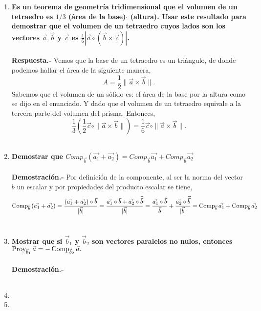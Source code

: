 \begin{enumerate}
\item \textbf{\boldmath Es un teorema de geometría tridimensional que el volumen de un tetraedro es $1/3$ (área de la base)$\cdot$ (altura). Usar este resultado para demostrar que el volumen de un tetraedro cuyos lados son los vectores $\vec{a},\vec{b}$ y $\vec{c}$ es $\frac{1}{6}\left|\vec{a}\circ \left(\vec{b}\times \vec{c}\right)\right|$.\\\\
    Respuesta.-}\; Vemos que la base de un tetraedro es un triángulo, de donde podemos hallar el área de la siguiente manera,
    $$A=\dfrac{1}{2}\|\vec{a}\times \vec{b}\|.$$
    Sabemos que el volumen de un sólido es: el área de la base por la altura como se dijo en el enunciado. Y dado que el volumen de un tetraedro equivale a la tercera parte del volumen del prisma. Entonces,
    $$\dfrac{1}{3}\left(\dfrac{1}{2}\vec{c}\circ \|\vec{a}\times \vec{b}\|\right)=\dfrac{1}{6}\vec{c}\circ \|\vec{a}\times \vec{b}\|.$$\\

\item \textbf{\boldmath Demostrar que $Comp_{\vec{b}}\left(\vec{a_1}+\vec{a_2}\right) = Comp_{\vec{b}}\vec{a_1} + Comp_{\vec{b}}\vec{a_2}$\\\\
    Demostración.-}\; Por definición de la componente, al ser la norma del vector $b$ un escalar y por propiedades del producto escalar se tiene, 
    $$\mathop{\mbox{\normalfont Comp}}\nolimits_{\vec{b}}\left(\vec{a_1}+\vec{a_2}\right) = \dfrac{\left(\vec{a_1}+\vec{a_2}\right)\circ \vec{b}}{|\vec{b}|}=\dfrac{\vec{a_1}\circ \vec{b} + \vec{a_2} \circ \vec{\vec{b}}}{|\vec{b}|} = \dfrac{\vec{a_1}\circ \vec{b}}{\vec{b}} + \dfrac{\vec{a_2} \circ \vec{\vec{b}}}{|\vec{b}|} =  \mathop{\mbox{\normalfont Comp}}\nolimits_{\vec{b}}\vec{a_1} + \mathop{\mbox{\normalfont Comp}}\nolimits_{\vec{b}}\vec{a_2}$$\\

\item \textbf{\boldmath Mostrar que si $\vec{b}_1$ y $\vec{b}_2$ son vectores paralelos no nulos, entonces $\mathop{\mbox{\normalfont Proy}}\nolimits_{\vec{b}_1}\vec{a}=-\mathop{\mbox{\normalfont Comp}}\nolimits_{\vec{b}_2}\vec{a}.$\\\\
    Demostración.-}\;\\\\

\item 

\item 


\end{enumerate}
